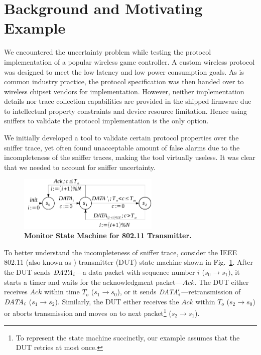 \section{Background and Motivating Example}
\label{sec:motivation}

We encountered the uncertainty problem while testing the protocol implementation
of a popular wireless game controller. A custom wireless protocol
was designed to meet the low latency and low power consumption goals. As is
common industry practice, the protocol specification was then handed over to
wireless chipset vendors for implementation. However, neither implementation
details nor trace collection capabilities are provided in the shipped firmware
due to intellectual property constraints and device resource limitation. Hence
using sniffers to validate the protocol implementation is the only option.

We initially developed a tool to validate certain protocol properties over the
sniffer trace, yet often found unacceptable amount of false alarms due to
the incompleteness of the sniffer traces, making the tool virtually useless. It
was clear that we needed to account for sniffer uncertainty.

\begin{figure}[t!]
  \centering
  \includegraphics[width=0.6\textwidth]{./figures/dot11_tx_ta.pdf}
  \caption{\textbf{Monitor State Machine for 802.11 Transmitter.}}
  \label{fig:dot11_tx_ta}
\end{figure}


To better understand the incompleteness of sniffer trace, consider the IEEE
802.11 (also known as \wifi{}) transmitter (DUT) state machine shown in
Fig.~\ref{fig:dot11_tx_ta}. After the DUT sends $\it{DATA}_i$---a data packet with
sequence number $i$ ($s_0\rightarrow s_1)$, it starts a timer and waits for the
acknowledgment packet---$Ack$. The DUT either receives $Ack$ within time $T_o$
($s_1\rightarrow s_0$), or it sends $\it{DATA}'_i$---retransmission of $\it{DATA}_i$
($s_1\rightarrow s_2$). Similarly, the DUT either receives the $Ack$ within $T_o$
($s_2\rightarrow s_0$) or aborts transmission and moves on to next
packet\footnote{To represent the state machine succinctly, our example assumes
that the DUT retries at most once.} ($s_2\rightarrow s_1$).


